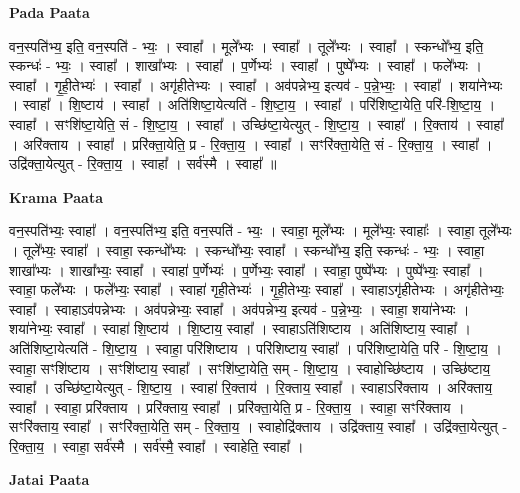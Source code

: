 \documentclass[17pt]{extarticle}
\begin{document}
\textbf{Pada Paata} \newline

वन॒स्पति॑भ्य॒ इति॒ वन॒स्पति॑ - भ्यः॒ । स्वाहा᳚ । मूले᳚भ्यः । स्वाहा᳚ । तूले᳚भ्यः । स्वाहा᳚ । स्कन्धो᳚भ्य॒ इति॒ स्कन्धः॑ - भ्यः॒ । स्वाहा᳚ । शाखा᳚भ्यः । स्वाहा᳚ । प॒र्णेभ्यः॑ । स्वाहा᳚ । पुष्पे᳚भ्यः । स्वाहा᳚ । फले᳚भ्यः । स्वाहा᳚ । गृ॒ही॒तेभ्यः॑ । स्वाहा᳚ । अगृ॑हीतेभ्यः । स्वाहा᳚ । अव॑पन्नेभ्य॒ इत्यव॑ - प॒न्ने॒भ्यः॒ । स्वाहा᳚ । शया॑नेभ्यः । स्वाहा᳚ । शि॒ष्टाय॑ । स्वाहा᳚ । अति॑शिष्टा॒येत्यति॑ - शि॒ष्टा॒य॒ । स्वाहा᳚ । परि॑शिष्टा॒येति॒ परि॑-शि॒ष्टा॒य॒ । स्वाहा᳚ । सꣳशि॑ष्टा॒येति॒ सं - शि॒ष्टा॒य॒ । स्वाहा᳚ । उच्छि॑ष्टा॒येत्युत् - शि॒ष्टा॒य॒ । स्वाहा᳚ । रि॒क्ताय॑ । स्वाहा᳚ । अरि॑क्ताय । स्वाहा᳚ । प्ररि॑क्ता॒येति॒ प्र - रि॒क्ता॒य॒ । स्वाहा᳚ । सꣳरि॑क्ता॒येति॒ सं - रि॒क्ता॒य॒ । स्वाहा᳚ । उद्रि॑क्ता॒येत्युत् - रि॒क्ता॒य॒ । स्वाहा᳚ । सर्व॑स्मै । स्वाहा᳚ ॥  \newline


\textbf{Krama Paata} \newline

वन॒स्पति॑भ्यः॒ स्वाहा᳚ । वन॒स्पति॑भ्य॒ इति॒ वन॒स्पति॑ - भ्यः॒ । स्वाहा॒ मूले᳚भ्यः । मूले᳚भ्यः॒ स्वाहाः᳚ । स्वाहा॒ तूले᳚भ्यः । तूले᳚भ्यः॒ स्वाहा᳚ । स्वाहा॒ स्कन्धो᳚भ्यः । स्कन्धो᳚भ्यः॒ स्वाहा᳚ । स्कन्धो᳚भ्य॒ इति॒ स्कन्धः॑ - भ्यः॒ । स्वाहा॒ शाखा᳚भ्यः । शाखा᳚भ्यः॒ स्वाहा᳚ । स्वाहा॑ प॒र्णेभ्यः॑ । प॒र्णेभ्यः॒ स्वाहा᳚ । स्वाहा॒ पुष्पे᳚भ्यः । पुष्पे᳚भ्यः॒ स्वाहा᳚ । स्वाहा॒ फले᳚भ्यः । फले᳚भ्यः॒ स्वाहा᳚ । स्वाहा॑ गृही॒तेभ्यः॑ । गृ॒ही॒तेभ्यः॒ स्वाहा᳚ । स्वाहाऽगृ॑हीतेभ्यः । अगृ॑हीतेभ्यः॒ स्वाहा᳚ । स्वाहाऽव॑पन्नेभ्यः । अव॑पन्नेभ्यः॒ स्वाहा᳚ । अव॑पन्नेभ्य॒ इत्यव॑ - प॒न्ने॒भ्यः॒ । स्वाहा॒ शया॑नेभ्यः । शया॑नेभ्यः॒ स्वाहा᳚ । स्वाहा॑ शि॒ष्टाय॑ । शि॒ष्टाय॒ स्वाहा᳚ । स्वाहाऽति॑शिष्टाय । अति॑शिष्टाय॒ स्वाहा᳚ । अति॑शिष्टा॒येत्यति॑ - शि॒ष्टा॒य॒ । स्वाहा॒ परि॑शिष्टाय । परि॑शिष्टाय॒ स्वाहा᳚ । परि॑शिष्टा॒येति॒ परि॑ - शि॒ष्टा॒य॒ । स्वाहा॒ सꣳशि॑ष्टाय । सꣳशि॑ष्टाय॒ स्वाहा᳚ । सꣳशि॑ष्टा॒येति॒ सम् - शि॒ष्टा॒य॒ । स्वाहोच्छि॑ष्टाय । उच्छि॑ष्टाय॒ स्वाहा᳚ । उच्छि॑ष्टा॒येत्युत् - शि॒ष्टा॒य॒ । स्वाहा॑ रि॒क्ताय॑ । रि॒क्ताय॒ स्वाहा᳚ । स्वाहाऽरि॑क्ताय । अरि॑क्ताय॒ स्वाहा᳚ । स्वाहा॒ प्ररि॑क्ताय । प्ररि॑क्ताय॒ स्वाहा᳚ । प्ररि॑क्ता॒येति॒ प्र - रि॒क्ता॒य॒ । स्वाहा॒ सꣳरि॑क्ताय । सꣳरि॑क्ताय॒ स्वाहा᳚ । सꣳरि॑क्ता॒येति॒ सम् - रि॒क्ता॒य॒ । स्वाहोद्रि॑क्ताय । उद्रि॑क्ताय॒ स्वाहा᳚ । उद्रि॑क्ता॒येत्युत् - रि॒क्ता॒य॒ । स्वाहा॒ सर्व॑स्मै । सर्व॑स्मै॒ स्वाहा᳚ । स्वाहेति॒ स्वाहा᳚ । \newline

\textbf{Jatai Paata} \newline
\end{document}
